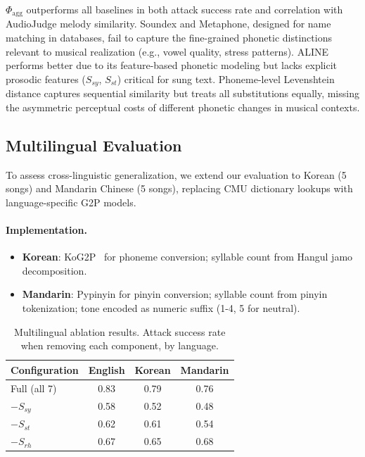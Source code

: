 $\Phi_{\text{agg}}$ outperforms all baselines in both attack success rate and correlation with AudioJudge melody similarity. Soundex and Metaphone, designed for name matching in databases, fail to capture the fine-grained phonetic distinctions relevant to musical realization (e.g., vowel quality, stress patterns). ALINE performs better due to its feature-based phonetic modeling but lacks explicit prosodic features ($S_{sy}$, $S_{st}$) critical for sung text. Phoneme-level Levenshtein distance captures sequential similarity but treats all substitutions equally, missing the asymmetric perceptual costs of different phonetic changes in musical contexts.

\subsection{Multilingual Evaluation}
\label{sec:multilingual}

To assess cross-linguistic generalization, we extend our evaluation to Korean (5 songs) and Mandarin Chinese (5 songs), replacing CMU dictionary lookups with language-specific G2P models.

\paragraph{Implementation.}
\begin{itemize}[noitemsep,topsep=0pt]
    \item \textbf{Korean}: KoG2P~\cite{park2019g2pk} for phoneme conversion; syllable count from Hangul jamo decomposition.
    \item \textbf{Mandarin}: Pypinyin for pinyin conversion; syllable count from pinyin tokenization; tone encoded as numeric suffix (1-4, 5 for neutral).
\end{itemize}

\begin{table}[h]
\centering
\caption{Multilingual ablation results. Attack success rate when removing each component, by language.}
\label{tab:multilingual}
\begin{tabular}{lccc}
\toprule
\textbf{Configuration} & \textbf{English} & \textbf{Korean} & \textbf{Mandarin} \\
\midrule
Full (all 7)    & 0.83 & 0.79 & 0.76 \\
$-S_{sy}$       & 0.58 & 0.52 & 0.48 \\
$-S_{st}$       & 0.62 & 0.61 & 0.54 \\
$-S_{rh}$       & 0.67 & 0.65 & 0.68 \\
\bottomrule
\end{tabular}
\end{table}

